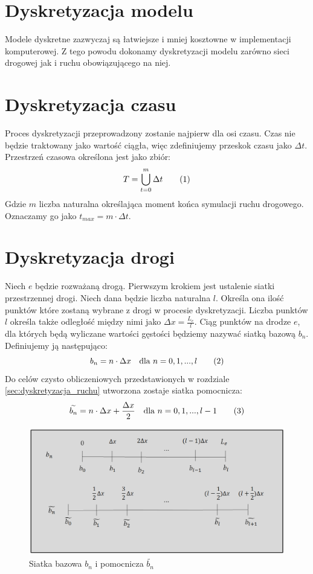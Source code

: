 \documentclass[12pt]{book}
\newcommand\addtag{\refstepcounter{equation}\tag{\theequation}}
\begin{document}
\section{Dyskretyzacja modelu}
Modele dyskretne zazwyczaj są łatwiejsze i mniej kosztowne w implementacji komputerowej. Z tego powodu dokonamy dyskretyzacji modelu zarówno sieci drogowej jak i ruchu obowiązującego na niej.
\section{Dyskretyzacja czasu}
Proces dyskretyzacji przeprowadzony zostanie najpierw dla osi czasu. Czas nie będzie traktowany jako wartość ciągła, więc zdefiniujemy przeskok czasu jako $\Delta t$. Przestrzeń czasowa określona jest jako zbiór:
\[
T=\bigcup_{t=0}^{m} \Delta t \addtag
\]
Gdzie $m$ liczba naturalna określająca moment końca symulacji ruchu drogowego. Oznaczamy go jako $t_{max}=m \cdot \Delta t$.


\section{Dyskretyzacja drogi}
Niech $e$ będzie rozważaną drogą. Pierwszym krokiem jest ustalenie siatki przestrzennej drogi. Niech dana będzie liczba naturalna $l$. Określa ona ilość punktów które zostaną wybrane z drogi w procesie dyskretyzacji. Liczba punktów $l$ określa także odległość między nimi jako $\Delta x=\frac{L_e}{l}$. Ciąg punktów na drodze $e$, dla których będą wyliczane wartości gęstości będziemy nazywać siatką bazową $b_n$. Definiujemy ją następująco: 
\[b_n=n\cdot \Delta x \quad \text{dla }n=0,1,...,l \addtag \]
Do celów czysto obliczeniowych przedstawionych w rozdziale \ref{sec:dyskretyzacja_ruchu} utworzona zostaje siatka pomocnicza:
\[\widetilde{b_n}=n\cdot \Delta x+\frac{\Delta x}{2} \quad \text{dla }n=0,1,...,l-1 \addtag\]

\begin{figure}[H]
  \centering
    \includegraphics[width=14cm]{odcinki-2}
 \caption{Siatka bazowa $b_n$ i pomocnicza $\widetilde{b_n}$}
 \label{fig:siatka}
\end{figure}
\end{document}
